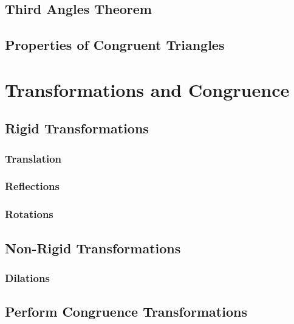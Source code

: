 \documentclass[]{book}
\begin{document}
\subsection{Third Angles Theorem}\label{third-angles-theorem}

\subsection{Properties of Congruent
Triangles}\label{properties-of-congruent-triangles}

\section{Transformations and
Congruence}\label{transformations-and-congruence}

\subsection{Rigid Transformations}\label{rigid-transformations}

\subsubsection{Translation}\label{translation}

\subsubsection{Reflections}\label{reflections}

\subsubsection{Rotations}\label{rotations}

\subsection{Non-Rigid Transformations}\label{non-rigid-transformations}

\subsubsection{Dilations}\label{dilations}

\subsection{Perform Congruence
Transformations}\label{perform-congruence-transformations}
\end{document}
